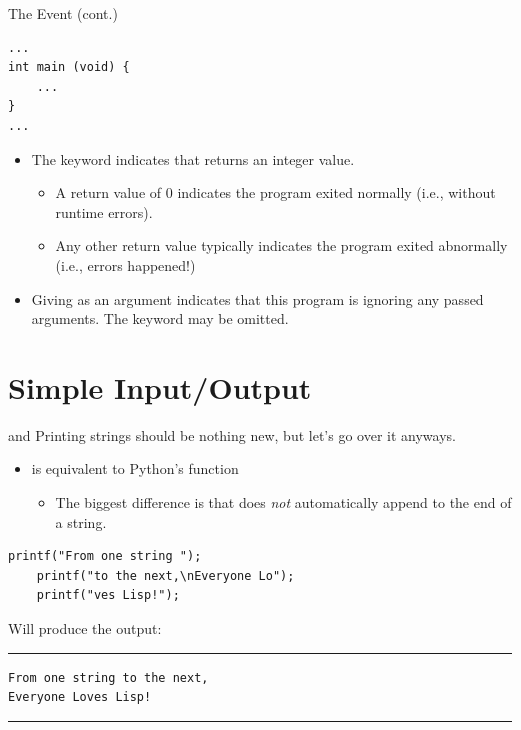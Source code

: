 \documentclass[11pt]{beamer}
\let\OldTexttt\texttt
\renewcommand{\texttt}[1]{\OldTexttt{\color{teal}{#1}}}
\begin{document}
\begin{frame}[fragile=singleslide]{The \texttt{main} Event (cont.)}
\begin{lstlisting}[style=C]
...
int main (void) { 
	...
}
...
\end{lstlisting}
\begin{itemize}
\item The \texttt{int} keyword indicates that \texttt{main} returns an integer value.
	\begin{itemize}
	\item A return value of 0 indicates the program exited normally (i.e., without runtime errors).
	\item Any other return value typically indicates the program exited abnormally (i.e., errors happened!)
	\end{itemize}
\item Giving \texttt{void} as an argument indicates that this program is ignoring any passed arguments.  The \texttt{void} keyword may be omitted.
\end{itemize}
\end{frame}

\section[I/O]{Simple Input/Output}
\begin{frame}[fragile=singleslide]{\texttt{printf()} and \texttt{stdout}}
Printing strings should be nothing new, but let's go over it anyways.
\begin{itemize}
\item \texttt{printf()} is equivalent to Python's \texttt{print()} function
\begin{itemize}
\item The biggest difference is that \texttt{printf()} does \emph{not} automatically append \texttt{\textbackslash n} to the end of a string.
\end{itemize} 
\end{itemize}
\begin{lstlisting}[style=C]
	printf("From one string ");
	printf("to the next,\nEveryone Lo");
	printf("ves Lisp!");
\end{lstlisting}
Will produce the output:
\hrule
\begin{verbatim}
From one string to the next, 
Everyone Loves Lisp!
\end{verbatim}
\hrule
\end{frame}
\end{document}
